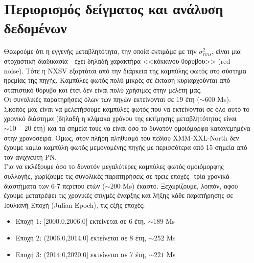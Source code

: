 \section{Περιορισμός δείγματος και ανάλυση δεδομένων}

Θεωρούμε ότι η εγγενής μεταβλητότητα, την οποία εκτιμάμε με την $\sigma_{rms}^2$, είναι μια στοχαστική διαδικασία - έχει δηλαδή χαρακτήρα <<κόκκινου θορύβου>> \textlatin{(red noise)}. Τότε η \textlatin{NXSV} εξαρτάται από την διάρκεια της καμπύλης φωτός στο σύστημα ηρεμίας της πηγής. Καμπύλες φωτός πολύ μικρές σε έκταση κυριαρχούνται από στατιστικό θόρυβο και έτσι δεν είναι πολύ χρήσιμες στην μελέτη μας\cite{2017MNRAS.471.4398P}.\\
Οι συνολικές παρατηρήσεις όλων των πηγών εκτείνονται σε 19 έτη ($\sim 600$ \textlatin{Ms}). Σκοπός μας είναι να μελετήσουμε καμπύλες φωτός που να εκτείνονται σε όλο αυτό το χρονικό διάστημα (δηλαδή η κλίμακα χρόνου της εκτίμησης μεταβλητότητας είναι $\sim 10-20$ έτη) και τα σημεία τους να είναι όσο το δυνατόν ομοιόμορφα κατανεμημένα στην χρονοσειρά. Όμως, στον πλήρη πληθυσμό του πεδίου \textlatin{XMM-XXL-North} δεν έχουμε καμία καμπύλη φωτός μεμονομένης πηγής με περισσότερα από 15 σημεία από τον ανιχνευτή ΡΝ.\\
Για να εκλέξουμε όσο το δυνατόν μεγαλύτερες καμπύλες φωτός ομοιόμορφης συλλογής, χωρίζουμε τις συνολικές παρατηρήσεις σε τρεις εποχές- τρία χρονικά διαστήματα των 6-7 περίπου ετών ($\sim 200 $\textlatin{ Ms}) έκαστο. Ξεχωρίζουμε, λοιπόν, αφού έχουμε μετατρέψει τις χρονικές στιγμές έναρξης και λήξης κάθε παρατήρησης σε Ιουλιανή Εποχή (\textlatin{Julian Epoch}), τις εξής εποχές: 
\begin{itemize}
    \item Εποχή 1: [2000.0,2006.0] εκτείνεται σε 6 έτη, $\sim 189$ \textlatin{Ms}
    \item Εποχή 2: (2006.0,2014.0] εκτείνεται σε 8 έτη, $\sim 252$ \textlatin{Ms}
    \item Εποχή 3: (2014.0,2020.0] εκτείνεται σε 7 έτη, $\sim 221$ \textlatin{Ms}
\end{itemize}


